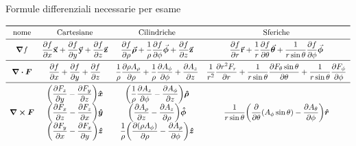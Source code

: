\documentclass[a4paper]{scrarticle}
\begin{document}
\pagebreak

\begin{sidewaystable}
\caption{Formule differenziali necessarie per esame}
    \[
\begin{array}{cccc}
    \toprule
    \text{nome} & \text{Cartesiane} & \text{Cilindriche} & \text{Sferiche}\\
\midrule
\displaystyle \grad{f} & 
    \displaystyle \pdv{f}{x} \va x + \pdv{f}{y} \va y + \pdv{f}{z} \va z &
    \displaystyle \pdv{f}{\rho} \va {\bm \rho} + \frac{1}{\rho}\pdv{f}{\phi}\va {\bm\phi} + \pdv{f}{z} \va z &
    \displaystyle \pdv{f}{r} \va r + \frac{1}{r} \pdv{f}{\theta} \va {\bm\theta} + \frac{1}{r\sin{\theta}} \pdv{f}{\phi} \va{\bm \phi}\\ 
\midrule
\displaystyle \div{\bm{F}} &
    \displaystyle \pdv{f}{x} + \pdv{f}{y} + \pdv{f}{z} &
    \displaystyle \frac{1}{\rho} \pdv{ \rho A_\rho } { \rho}
    + \frac{1} {\rho}\pdv {A_\phi} {\phi}
    + \pdv{ A_z} {z}&
    \displaystyle \frac{1}{r^2} \pdv{r^2 F_r}{r} + \frac{1}{r \sin \theta} \pdv{F_{\theta} \sin \theta}{\theta} + \frac{1}{ r \sin \theta}\pdv{F_{\phi}}{\phi}\\ 
\midrule
\displaystyle \curl{\bm{F}} & 
\begin{matrix}
    \displaystyle \bigg(\pdv{F_z}{y} - \pdv{F_y}{z} \bigg) \boldsymbol{\hat x}\\
    \displaystyle \bigg(\pdv{F_x}{z} - \pdv{F_z}{x}\bigg) \boldsymbol{\hat y}\\
    \displaystyle \bigg(\pdv{F_y}{x} - \pdv{F_x}{y}\bigg) \boldsymbol{\hat z}
\end{matrix} & 
\begin{matrix}
    \displaystyle \bigg (\frac{1 }{ \rho}\pdv{ A_z }{ \phi}
    - \pdv{A_\phi }{  z} \bigg ) \boldsymbol{\hat \rho}  \\
    \displaystyle \bigg (\pdv{A_\rho }{z} - \pdv{A_z }{\rho} \bigg) \boldsymbol{\hat \phi} \\
    \displaystyle \frac{1 }{ \rho}\bigg (\pdv{( \rho A_\phi ) }{\rho}
    - \pdv{A_\rho}{\phi} \bigg ) \boldsymbol{\hat z}
\end{matrix} &
\begin{matrix}
    \displaystyle \frac{1}{ r\sin\theta} \bigg (\frac{\partial }{ \partial \theta} ( A_\phi\sin\theta )
    - \frac{\partial A_\theta }{ \partial \phi} \bigg ) \boldsymbol{\hat r} \\

\end{matrix}
\end{array}\]
\end{sidewaystable}
\end{document}
